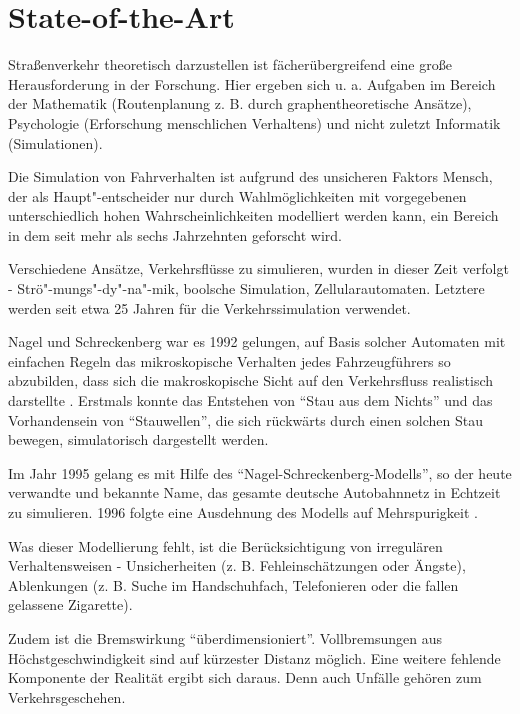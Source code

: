 \section{State-of-the-Art}
\label{sec:sota}


Straßenverkehr theoretisch darzustellen ist fächerübergreifend eine große Herausforderung in der Forschung.
Hier ergeben sich u. a. Aufgaben im Bereich der Mathematik (Routenplanung z. B. durch graphentheoretische Ansätze), Psychologie (Erforschung menschlichen Verhaltens) und nicht zuletzt Informatik (Simulationen).

Die Simulation von Fahrverhalten ist aufgrund des unsicheren Faktors Mensch, der als Haupt"-entscheider nur durch Wahlmöglichkeiten mit vorgegebenen unterschiedlich hohen Wahrscheinlichkeiten modelliert werden kann, ein Bereich in dem seit mehr als sechs Jahrzehnten geforscht wird.

Verschiedene Ansätze, Verkehrsflüsse zu simulieren, wurden in dieser Zeit verfolgt - Strö"-mungs"-dy"-na"-mik, boolsche Simulation, Zellularautomaten. Letztere werden seit etwa 25 Jahren für die Verkehrssimulation verwendet.

Nagel und Schreckenberg war es 1992 gelungen, auf Basis solcher Automaten mit einfachen Regeln das mikroskopische Verhalten jedes Fahrzeugführers so abzubilden, dass sich die makroskopische Sicht auf den Verkehrsfluss realistisch darstellte \cite{na-sch}.
Erstmals konnte das Entstehen von \enquote{Stau aus dem Nichts} und das Vorhandensein von \enquote{Stauwellen}, die sich rückwärts durch einen solchen Stau bewegen, simulatorisch dargestellt werden.

Im Jahr 1995 gelang es mit Hilfe des \enquote{Nagel-Schreckenberg-Modells}, so der heute verwandte und bekannte Name, das gesamte deutsche Autobahnnetz in Echtzeit zu simulieren. 
1996 folgte eine Ausdehnung des Modells auf Mehrspurigkeit \cite{multi-lane}. 

Was dieser Modellierung fehlt, ist die Berücksichtigung von irregulären Verhaltensweisen - Unsicherheiten (z. B. Fehleinschätzungen oder Ängste), Ablenkungen (z. B. Suche im Handschuhfach, Telefonieren oder die fallen gelassene Zigarette). 

Zudem ist die Bremswirkung \enquote{überdimensioniert}. 
Vollbremsungen aus Höchstgeschwindigkeit sind auf kürzester Distanz möglich.
Eine weitere fehlende Komponente der Realität ergibt sich daraus.
Denn auch Unfälle gehören zum Verkehrsgeschehen.

